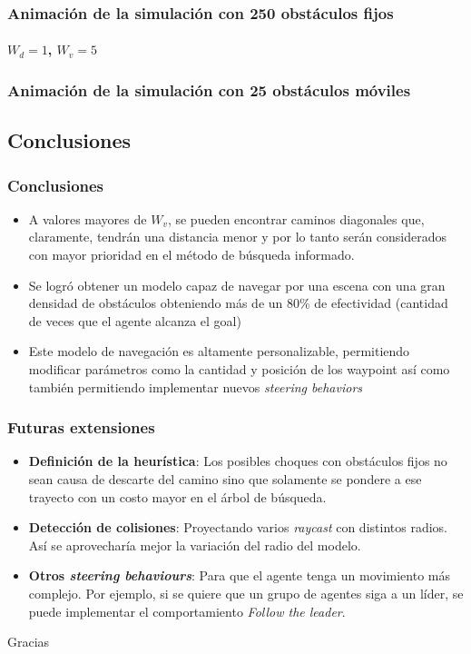 \documentclass[hyperref={pdfpagelayout=SinglePage}]{beamer}
\begin{document}
\begin{frame}[plain]
\frametitle{Animación de la simulación con 250 obstáculos fijos}
\framesubtitle{$W_{d} = 1$, $W_{v} = 5$}
\begin{figure}[H]
	\centering
\end{figure}
\end{frame}

\begin{frame}[plain]
\frametitle{Animación de la simulación con 25 obstáculos móviles}
\begin{figure}[H]
	\centering
\end{figure}
\end{frame}

\subsection{Conclusiones}

\begin{frame}
\frametitle{Conclusiones}
\begin{itemize}
\item A valores mayores de $W_{v}$, se pueden encontrar caminos diagonales que, claramente, tendrán una distancia menor y por lo tanto serán considerados con mayor prioridad en el método de búsqueda informado.
\item Se logró obtener un modelo capaz de navegar por una escena con una gran densidad de obstáculos obteniendo más de un 80\% de efectividad (cantidad de veces que el agente alcanza el goal)
\item Este modelo de navegación es altamente personalizable, permitiendo modificar parámetros como la cantidad y posición de los waypoint así como también permitiendo implementar nuevos \textit{steering behaviors}
\end{itemize}	
\end{frame} 

\begin{frame}
\frametitle{Futuras extensiones}
\begin{itemize}
\item \textbf{Definición de la heurística}: Los posibles choques con obstáculos fijos no sean causa de descarte del camino sino que solamente se pondere a ese trayecto con un costo mayor en el árbol de búsqueda.
\item \textbf{Detección de colisiones}: Proyectando varios \textit{raycast} con distintos radios. Así se aprovecharía mejor la variación del radio del modelo.
\item \textbf{Otros \textit{steering behaviours}}: Para que el agente tenga un movimiento más complejo. Por ejemplo, si se quiere que un grupo de agentes siga a un líder, se puede implementar el comportamiento \textit{Follow the leader}. 

\end{itemize}	
\end{frame} 

\begin{frame}[plain]
    \centering
	\Huge Gracias
\end{frame}
\end{document}
